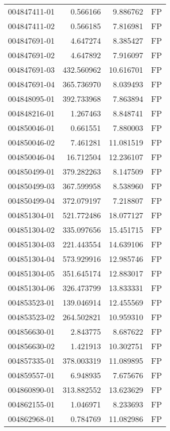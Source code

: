 \begin{tabular}{lrrl}
004847411-01 &    0.566166 &     9.886762 &   FP \\
004847411-02 &    0.566185 &     7.816981 &   FP \\
004847691-01 &    4.647274 &     8.385427 &   FP \\
004847691-02 &    4.647892 &     7.916097 &   FP \\
004847691-03 &  432.560962 &    10.616701 &   FP \\
004847691-04 &  365.736970 &     8.039493 &   FP \\
004848095-01 &  392.733968 &     7.863894 &   FP \\
004848216-01 &    1.267463 &     8.848741 &   FP \\
004850046-01 &    0.661551 &     7.880003 &   FP \\
004850046-02 &    7.461281 &    11.081519 &   FP \\
004850046-04 &   16.712504 &    12.236107 &   FP \\
004850499-01 &  379.282263 &     8.147509 &   FP \\
004850499-03 &  367.599958 &     8.538960 &   FP \\
004850499-04 &  372.079197 &     7.218807 &   FP \\
004851304-01 &  521.772486 &    18.077127 &   FP \\
004851304-02 &  335.097656 &    15.451715 &   FP \\
004851304-03 &  221.443554 &    14.639106 &   FP \\
004851304-04 &  573.929916 &    12.985746 &   FP \\
004851304-05 &  351.645174 &    12.883017 &   FP \\
004851304-06 &  326.473799 &    13.833331 &   FP \\
004853523-01 &  139.046914 &    12.455569 &   FP \\
004853523-02 &  264.502821 &    10.959310 &   FP \\
004856630-01 &    2.843775 &     8.687622 &   FP \\
004856630-02 &    1.421913 &    10.302751 &   FP \\
004857335-01 &  378.003319 &    11.089895 &   FP \\
004859557-01 &    6.948935 &     7.675676 &   FP \\
004860890-01 &  313.882552 &    13.623629 &   FP \\
004862155-01 &    1.046971 &     8.233693 &   FP \\
004862968-01 &    0.784769 &    11.082986 &   FP \\

\end{tabular}
